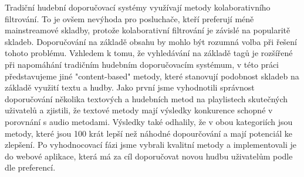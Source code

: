 \documentclass[12pt]{report}
\begin{document}
Tradiční hudební doporučovací systémy využívají metody kolaborativního filtrování. To je ovšem nevýhoda pro posluchače, kteří preferují méně mainstreamové skladby, protože kolaborativní filtrování je závislé na popularitě skladeb. Doporučování na základě obsahu by mohlo být rozumná volba při řešení tohoto problému. Vzhledem k tomu, že vyhledávání na základě tagů je rozšířené při napomáhání tradičním hudebním doporučovacím systémum, v této práci představujeme jiné "content-based" metody, které stanovují podobnost skladeb na základě využití textu a hudby. 
Jako první jsme vyhodnotili správnost doporučování několika textových a hudebních metod na playlistech skutečných uživatelů a zjistili, že textové metody mají výsledky konkurence schopné v porovnání s audio metodami. Výsledky také odhalily, že v obou kategoriích jsou metody, které jsou 100 krát lepší než náhodné dopourčování a mají potenciál ke zlepšení.
Po vyhodnocovací fázi jsme vybrali kvalitní metody a implementovali je do webové aplikace, která má za cíl doporučovat novou hudbu uživatelům podle dle preferencí.
\end{document}

